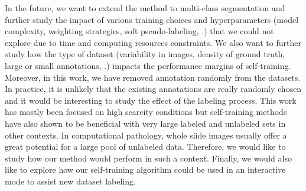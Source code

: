 In the future, we want to extend the method to multi-class segmentation and further study the impact of various training choices and hyperparameters (model complexity, weighting strategies, soft pseudo-labeling, \etc.) that we could not explore due to time and computing resources constraints. We also want to further study how the type of dataset (variability in images, density of ground truth, large or small annotations, \etc.) impacts the performance margins of self-training. Moreover, in this work, we have removed annotation randomly from the datasets. In practice, it is unlikely that the existing annotations are really randomly chosen and it would be interesting to study the effect of the labeling process. This work has mostly been focused on high scarcity conditions but self-training methods have also shown to be beneficial with very large labeled and unlabeled sets in other contexts. In computational pathology, whole slide images usually offer a great potential for a large pool of unlabeled data. Therefore, we would like to study how our method would perform in such a context. Finally, we would also like to explore how our self-training algorithm could be used in an interactive mode to assist new dataset labeling. %

